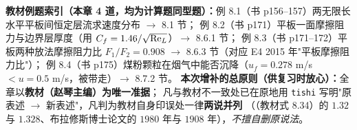 \textbf{教材例题索引（本章 4 道，均为计算题同型题）：}例 8.1（书 p156--157）两无限长水平平板间恒定层流求速度分布 $\to$ 8.1 节；
例 8.2（书 p171）平板一面摩擦阻力与边界层厚度（用 $C_f=1.46/\sqrt{\mathrm{Re}_L}$）$\to$ 8.6.1 节；
例 8.3（书 p171--172）平板两种放法摩擦阻力比 $F_1/F_2=0.908$ $\to$ 8.6.3 节（对应 E4 2015 年"平板摩擦阻力比"）；
例 8.4（书 p175）煤粉颗粒在烟气中能否沉降（$u_f=0.278$ m/s $<u=0.5$ m/s，被带走）$\to$ 8.7.2 节。
\textbf{本次增补的总原则（供复习时放心）：}全章以\textbf{教材（赵琴主编）为唯一准据}；
凡与教材不一致处已在原地用 \texttt{tishi} 写明"原表述 $\to$ 新表述"，凡判为教材自身印误处一律\textbf{两说并列}
（（教材式 8.34）的 $1.32$ 与 $1.328$、布拉修斯博士论文的 $1980$ 年与 $1908$ 年），\emph{不擅自删原说法}。
